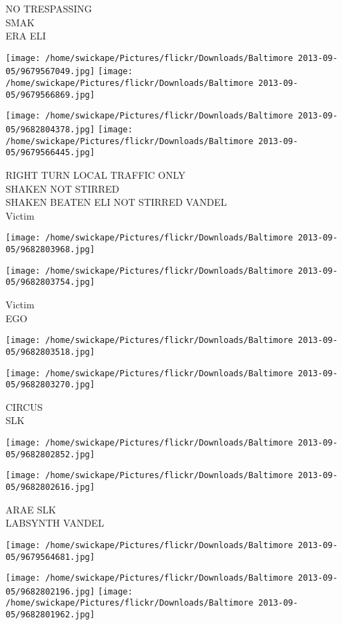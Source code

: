 \documentclass[10pt,letterpaper]{article}
\begin{document}
NO TRESPASSING\\
SMAK\\
ERA ELI
\pagebreak

\texttt{[image: /home/swickape/Pictures/flickr/Downloads/Baltimore 2013-09-05/9679567049.jpg]}
\texttt{[image: /home/swickape/Pictures/flickr/Downloads/Baltimore 2013-09-05/9679566869.jpg]}

\texttt{[image: /home/swickape/Pictures/flickr/Downloads/Baltimore 2013-09-05/9682804378.jpg]}
\texttt{[image: /home/swickape/Pictures/flickr/Downloads/Baltimore 2013-09-05/9679566445.jpg]}

RIGHT TURN LOCAL TRAFFIC ONLY\\
SHAKEN NOT STIRRED\\
SHAKEN BEATEN ELI NOT STIRRED VANDEL\\
Victim
\pagebreak

\texttt{[image: /home/swickape/Pictures/flickr/Downloads/Baltimore 2013-09-05/9682803968.jpg]}

\vspace{0.25in}
\texttt{[image: /home/swickape/Pictures/flickr/Downloads/Baltimore 2013-09-05/9682803754.jpg]}

Victim\\
EGO
\pagebreak

\texttt{[image: /home/swickape/Pictures/flickr/Downloads/Baltimore 2013-09-05/9682803518.jpg]}

\vspace{0.25in}
\texttt{[image: /home/swickape/Pictures/flickr/Downloads/Baltimore 2013-09-05/9682803270.jpg]}

CIRCUS\\
SLK
\pagebreak

\texttt{[image: /home/swickape/Pictures/flickr/Downloads/Baltimore 2013-09-05/9682802852.jpg]}

\vspace{0.25in}
\texttt{[image: /home/swickape/Pictures/flickr/Downloads/Baltimore 2013-09-05/9682802616.jpg]}

ARAE SLK\\
LABSYNTH VANDEL
\pagebreak

\texttt{[image: /home/swickape/Pictures/flickr/Downloads/Baltimore 2013-09-05/9679564681.jpg]}

\vspace{0.25in}
\texttt{[image: /home/swickape/Pictures/flickr/Downloads/Baltimore 2013-09-05/9682802196.jpg]}
\texttt{[image: /home/swickape/Pictures/flickr/Downloads/Baltimore 2013-09-05/9682801962.jpg]}
\end{document}
